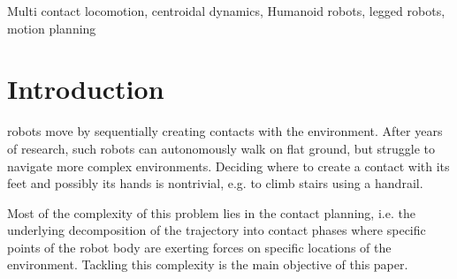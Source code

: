 \documentclass[journal]{IEEEtran}
\begin{document}
\begin{IEEEkeywords}
Multi contact locomotion, centroidal dynamics, Humanoid robots, legged robots, motion planning
\end{IEEEkeywords}






%
\IEEEpeerreviewmaketitle

\newcommand{\citep}[1]{\cite{#1}}	%
\newcommand{\citeauthor}[1]{\cite{#1}}	%

\section{Introduction}
\newcommand{\Pa}{$\mathcal{P}_1$ }
\newcommand{\Pb}{$\mathcal{P}_2$ }

 robots move by sequentially creating contacts with the environment.
After years of research, such robots can autonomously walk on flat ground, but struggle to navigate more complex environments.
Deciding
where
to
create a 
contact with its feet and
possibly
its
hands
is
nontrivial,
e.g. to climb stairs using a
handrail.

Most of the complexity of this problem lies in the contact planning, i.e. the underlying decomposition
of the trajectory into contact phases where specific points
of
the
robot body are exerting forces on specific locations
of
the
environment. Tackling this complexity is the main
objective
of this paper.
\end{document}
